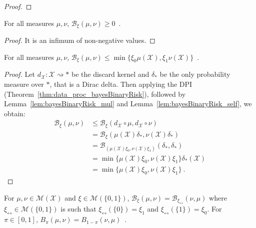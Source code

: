 \begin{proof}\leanok
\uses{}
\end{proof}


\begin{lemma}
  \label{lem:bayesBinaryRisk_nonneg}
  For all measures $\mu, \nu$, $\mathcal B_\xi(\mu, \nu) \ge 0$~.
\end{lemma}

\begin{proof}%
\uses{}
It is an infimum of non-negative values.
\end{proof}


\begin{lemma}
  \label{lem:bayesBinaryRisk_le}
  \leanok
  For all measures $\mu, \nu$, $\mathcal B_\xi(\mu, \nu) \le \min\{\xi_0 \mu(\mathcal X), \xi_1 \nu(\mathcal X)\}$~.
\end{lemma}

\begin{proof}\leanok
{}
Let $d_{\mathcal X} : \mathcal X \rightsquigarrow *$ be the discard kernel and $\delta_*$ be the only probability measure over $*$, that is a Dirac delta.
Then applying the DPI (Theorem~\ref{thm:data_proc_bayesBinaryRisk}), followed by Lemma~\ref{lem:bayesBinaryRisk_mul} and Lemma~\ref{lem:bayesBinaryRisk_self}, we obtain:
\begin{align*}
\mathcal B_\xi(\mu, \nu)
&\le \mathcal B_\xi(d_{\mathcal X} \circ \mu, d_{\mathcal X} \circ \nu)
\\
&= \mathcal B_\xi(\mu(\mathcal X) \delta_*, \nu(\mathcal X) \delta_*)
\\
&= \mathcal B_{(\mu(\mathcal X) \xi_0, \nu(\mathcal X) \xi_1)}(\delta_*, \delta_*)
\\
&= \min\{\mu(\mathcal X) \xi_0, \nu(\mathcal X) \xi_1\} \delta_*(\mathcal X)
\\
&= \min\{\mu(\mathcal X) \xi_0, \nu(\mathcal X) \xi_1\}
\: .
\end{align*}
\end{proof}


\begin{lemma}
  \label{lem:bayesBinaryRisk_symm}
  \leanok
  For $\mu, \nu \in \mathcal M(\mathcal X)$ and $\xi \in \mathcal M(\{0,1\})$, $\mathcal B_\xi(\mu, \nu) = \mathcal B_{\xi_{\leftrightarrow}}(\nu, \mu)$ where $\xi_{\leftrightarrow} \in \mathcal M(\{0,1\})$ is such that $\xi_{\leftrightarrow}(\{0\}) = \xi_1$ and $\xi_{\leftrightarrow}(\{1\}) = \xi_0$.
  For $\pi \in [0,1]$, $B_\pi(\mu, \nu) = B_{1 - \pi}(\nu, \mu)$~.
\end{lemma}

